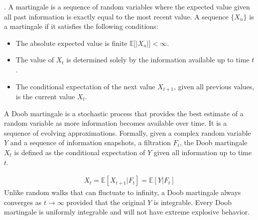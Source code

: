 \begin{definition}[Martingale]. A martingale is a sequence of random variables where the expected value given all past information is exactly equal to the most recent value.  A sequence $\{X_n\}$ is a martingale if it satisfies the following conditions:
\begin{itemize}
\item The absolute expected value is finite $\mathbb{E}\big[|X_n|\big] < \infty$.
\item The value of $X_t$ is determined solely by the information available up to time $t$.
\item The conditional expectation of the next value $X_{t+1}$, given all previous values, is the current value $X_t$.
\end{itemize}
\end{definition}

\begin{definition}
A Doob martingale is a stochastic process that provides the best estimate of a random variable as more information becomes available over time. It is a sequence of evolving approximations. Formally, given a complex random variable $Y$ and a sequence of information snapshots, a filtration $\mathit{F}_t$, the Doob martingale $X_t$ is defined as the conditional expectation of $Y$ given all information up to time $t$.
\end{definition}
\begin{align*}
X_t=\mathbb{E}[X_{t+1} | \mathit{F}_t] = \mathbb{E}[Y|\mathit{F}_t]
\end{align*}
Unlike random walks that can fluctuate to infinity, a Doob martingale always converges as $t\rightarrow \infty$ provided that the original $Y$ is integrable. Every Doob martingale is uniformly integrable and will not have extreme explosive behavior.

